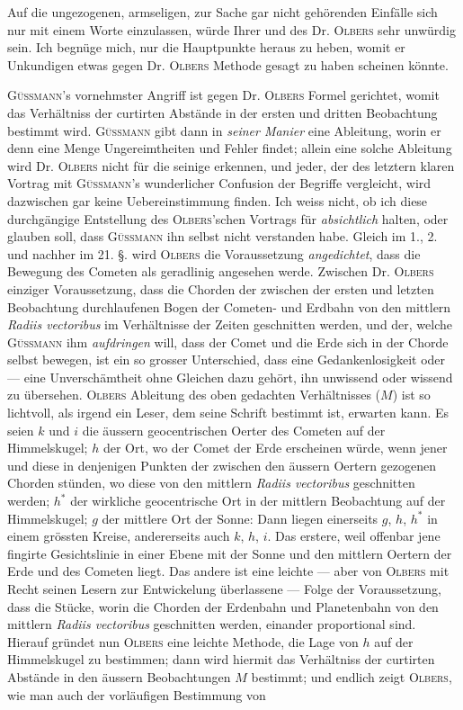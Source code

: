 Auf die ungezogenen, armseligen, zur Sache gar nicht gehörenden Einfälle sich nur mit einem Worte einzulassen, würde Ihrer und des Dr. \textsc{Olbers} sehr unwürdig sein. Ich begnüge mich, nur die Hauptpunkte heraus zu heben, womit er Unkundigen etwas gegen Dr. \textsc{Olbers} Methode gesagt zu haben scheinen könnte.

\textsc{Güssmann}'s vornehmster Angriff ist gegen Dr. \textsc{Olbers} Formel gerichtet, womit das Verhältniss der curtirten Abstände in der ersten und dritten Beobachtung bestimmt wird. \textsc{Güssmann} gibt dann in \emph{seiner Manier} eine Ableitung, worin er denn eine Menge Ungereimtheiten und Fehler findet; allein eine solche Ableitung wird Dr. \textsc{Olbers} nicht für die seinige erkennen, und jeder, der des letztern klaren Vortrag mit \textsc{Güssmann}'s wunderlicher Confusion der Begriffe vergleicht, wird dazwischen gar keine Uebereinstimmung finden. Ich weiss nicht, ob ich diese durchgängige Entstellung des \textsc{Olbers}'schen Vortrags für \emph{absichtlich} halten, oder glauben soll, dass \textsc{Güssmann} ihn selbst nicht verstanden habe. Gleich im 1., 2. und nachher im 21. §. wird \textsc{Olbers} die Voraussetzung \emph{angedichtet}, dass die Bewegung des Cometen als geradlinig angesehen werde. Zwischen Dr. \textsc{Olbers} einziger Voraussetzung, dass die Chorden der zwischen der ersten und letzten Beobachtung durchlaufenen Bogen der Cometen- und Erdbahn von den mittlern \emph{Radiis vectoribus} im Verhältnisse der Zeiten geschnitten werden, und der, welche \textsc{Güssmann} ihm \emph{aufdringen} will, dass der Comet und die Erde sich in der Chorde selbst bewegen, ist ein so grosser Unterschied, dass eine Gedankenlosigkeit oder — eine Unverschämtheit ohne Gleichen dazu gehört, ihn unwissend oder wissend zu übersehen. \textsc{Olbers} Ableitung des oben gedachten Verhältnisses ($M$) ist so lichtvoll, als irgend ein Leser, dem seine Schrift bestimmt ist, erwarten kann. Es seien $k$ und $i$ die äussern geocentrischen Oerter des Cometen auf der Himmelskugel; $h$ der Ort, wo der Comet der Erde erscheinen würde, wenn jener und diese in denjenigen Punkten der zwischen den äussern Oertern gezogenen Chorden stünden, wo diese von den mittlern \emph{Radiis vectoribus} geschnitten werden; $h^*$ der wirkliche geocentrische Ort in der mittlern Beobachtung auf der Himmelskugel; $g$ der mittlere Ort der Sonne: Dann liegen einerseits $g$, $h$, $h^*$ in einem grössten Kreise, andererseits auch $k$, $h$, $i$. Das erstere, weil offenbar jene fingirte Gesichtslinie in einer Ebene mit der Sonne und den mittlern Oertern der Erde und des Cometen liegt. Das andere ist eine leichte — aber von \textsc{Olbers} mit Recht seinen Lesern zur Entwickelung überlassene — Folge der Voraussetzung, dass die Stücke, worin die Chorden der Erdenbahn und Planetenbahn von den mittlern \emph{Radiis vectoribus} geschnitten werden, einander proportional sind. Hierauf gründet nun \textsc{Olbers} eine leichte Methode, die Lage von $h$ auf der Himmelskugel zu bestimmen; dann wird hiermit das Verhältniss der curtirten Abstände in den äussern Beobachtungen $M$ bestimmt; und endlich zeigt \textsc{Olbers}, wie man auch der vorläufigen Bestimmung von%
